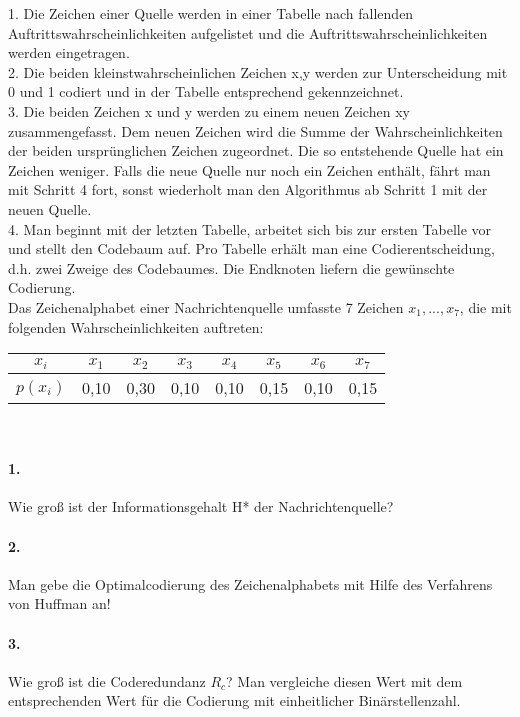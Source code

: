 \documentclass[paper=a4, fontsize=11pt]{scrartcl}
\numberwithin{equation}{section}
\numberwithin{figure}{section}
\numberwithin{table}{section}
\begin{document}
1. Die Zeichen einer Quelle werden in einer Tabelle nach fallenden Auftrittswahrscheinlichkeiten aufgelistet und die Auftrittswahrscheinlichkeiten werden eingetragen. \\
2. Die beiden kleinstwahrscheinlichen Zeichen x,y werden zur Unterscheidung mit 0 und 1 codiert und in der Tabelle entsprechend gekennzeichnet. \\
3. Die beiden Zeichen x und y werden zu einem neuen Zeichen xy zusammengefasst. Dem neuen Zeichen wird die Summe der Wahrscheinlichkeiten der beiden ursprünglichen Zeichen zugeordnet. Die so entstehende Quelle hat ein Zeichen weniger. Falls die neue Quelle nur noch ein Zeichen enthält, fährt man mit Schritt 4 fort, sonst wiederholt man den Algorithmus ab Schritt 1 mit der neuen Quelle. \\
4. Man beginnt mit der letzten Tabelle, arbeitet sich bis zur ersten Tabelle vor und stellt den Codebaum auf. Pro Tabelle erhält man eine Codierentscheidung, d.h. zwei Zweige des Codebaumes. Die Endknoten liefern die gewünschte Codierung. \\

Das Zeichenalphabet einer Nachrichtenquelle umfasste 7 Zeichen $x_{1}, ..., x_{7}$, die mit folgenden Wahrscheinlichkeiten auftreten: 

\begin{center}
\begin{tabular}{|c||c|c|c|c|c|c|c|}
\hline
$x_{i}$ & $x_{1}$ & $x_{2}$ & $x_{3}$ & $x_{4}$ & $x_{5}$ & $x_{6}$ & $x_{7}$ \\
\hline
$p(x_{i})$ & 0,10 & 0,30 & 0,10 & 0,10 & 0,15 & 0,10 & 0,15 \\
\hline
\end{tabular}
\end{center}
\\

\paragraph{1.}
Wie groß ist der Informationsgehalt H* der Nachrichtenquelle? \\

\paragraph{2.}
Man gebe die Optimalcodierung des Zeichenalphabets mit Hilfe des Verfahrens von Huffman an! \\

\paragraph{3.}
Wie groß ist die Coderedundanz $R_{c}$? Man vergleiche diesen Wert mit dem entsprechenden Wert für die Codierung mit einheitlicher Binärstellenzahl.

\end{document}
